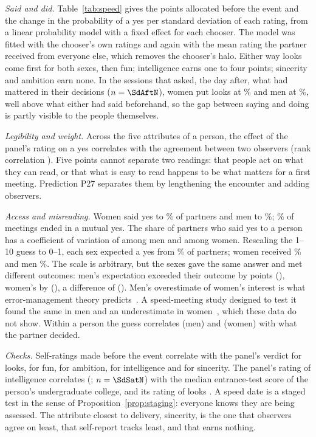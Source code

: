 \emph{Said and did.} Table~\ref{tab:speed} gives the points allocated before the event and the change in the probability
of a yes per standard deviation of each rating, from a linear probability model with a fixed effect for each chooser. The
model was fitted with the chooser's own ratings and again with the mean rating the partner received from everyone else,
which removes the chooser's halo. Either way looks come first for both sexes, then fun; intelligence earns one to four
points; sincerity and ambition earn none. In the sessions that asked, the day after, what had mattered in their decisions
($n=\SdAftN$), women put looks at \SdAftAttW\% and men at \SdAftAttM\%, well above what either had said beforehand, so the
gap between saying and doing is partly visible to the people themselves.

\emph{Legibility and weight.} Across the five attributes of a person, the effect of the panel's rating on a yes
correlates \SdLegPear{} with the agreement between two observers (rank correlation \SdLegSpear). Five points cannot
separate two readings: that people act on what they can read, or that what is easy to read happens to be what matters for
a first meeting. Prediction P27 separates them by lengthening the encounter and adding observers.

\emph{Access and misreading.} Women said yes to \SdYesW\% of partners and men to \SdYesM\%; \SdMatch\% of meetings ended
in a mutual yes. The share of partners who said yes to a person has a coefficient of variation of \SdPopCVM{} among men
and \SdPopCVW{} among women. Rescaling the 1--10 guess to 0--1, each sex expected a yes from \SdExpW\% of partners; women
received \SdActW\% and men \SdActM\%. The scale is arbitrary, but the sexes gave the same answer and met different
outcomes: men's expectation exceeded their outcome by \SdGapM{} points (\SdGapMCI), women's by \SdGapW{} (\SdGapWCI), a
difference of \SdGapDiff{} (\SdGapDiffCI). Men's overestimate of women's interest is what error-management theory predicts~\cite{haselton2000}. A speed-meeting
study designed to test it found the same in men and an underestimate in women~\cite{perilloux2012}, which these data do
not show. Within a person the guess correlates \SdAccM{} (men) and \SdAccW{} (women) with what the
partner decided.

\emph{Checks.} Self-ratings made before the event correlate \SdSelfAtt{} with the panel's verdict for looks, \SdSelfFun{}
for fun, \SdSelfAmb{} for ambition, \SdSelfInt{} for intelligence and \SdSelfSin{} for sincerity. The panel's rating of
intelligence correlates \SdSat{} (\SdSatCI; $n=\SdSatN$) with the median entrance-test score of the person's undergraduate
college, and its rating of looks \SdSatAtt. A speed date is a staged test in the sense of
Proposition~\ref{prop:staging}: everyone knows they are being assessed. The attribute closest to delivery, sincerity, is
the one that observers agree on least, that self-report tracks least, and that earns nothing.

